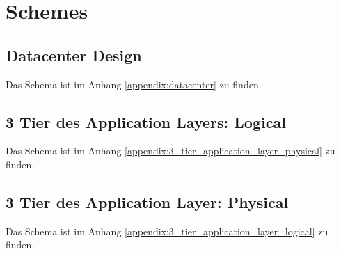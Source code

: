 \appendix

\section{Schemes}

\subsection{Datacenter Design}
Das Schema ist im Anhang \ref{appendix:datacenter} zu finden.

\subsection{3 Tier des Application Layers: Logical}
Das Schema ist im Anhang \ref{appendix:3_tier_application_layer_physical} zu finden.

\subsection{3 Tier des Application Layer: Physical}
Das Schema ist im Anhang \ref{appendix:3_tier_application_layer_logical} zu finden.


\listoftables


\label{appendix:datacenter}


\label{appendix:3_tier_application_layer_physical}





%  
% 



